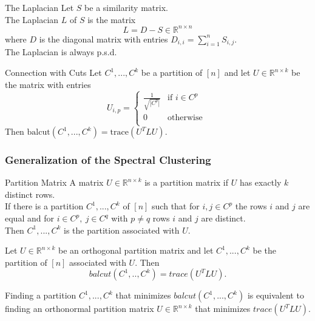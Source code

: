 \documentclass[english]{panikzettel}
\begin{document}
\begin{halfboxl}
\vspace{-\baselineskip}
	\begin{defi}{The Laplacian}
	Let $S$ be a similarity matrix. \\
	The Laplacian $L$ of $S$ is the matrix
	\[
	L=D-S\in \mathbb{R}^{n\times n}
	\]
	where $D$ is the diagonal matrix with entries $D_{i,i}=\sum_{i=1}^n S_{i,j}$.\\
	The Laplacian is always p.s.d.
	\end{defi}
\end{halfboxl}
\begin{halfboxr}
\vspace{-\baselineskip}
	\begin{theo}{Connection with Cuts}
	Let $C^1, ..., C^k$ be a partition of $[n]$ and let $U\in\mathbb{R}^{n\times k}$ be the matrix with entries
	\[
	U_{i,p}=
	\begin{cases}
	\frac{1}{\sqrt{|C^p|}} & \text{if } i\in C^p \\
	0 & \text{otherwise } \\
	\end{cases}
	\]
	Then $\text{balcut}(C^1,...,C^k)=\text{trace}(U^TLU)$.
	\end{theo}
\end{halfboxr}



\subsubsection{Generalization of the Spectral Clustering}
\begin{halfboxl}
\vspace{-\baselineskip}
	\begin{defi}{Partition Matrix}
	A matrix $U\in\mathbb{R}^{n\times k}$ is a partition matrix if $U$ has exactly $k$ distinct rows.\\

	If there is a partition $C^1,...,C^k$ of $[n]$ such that for $i,j\in C^p$ the rows $i$ and $j$ are equal and for $i\in C^p, \ j\in C^q$ with $p\neq q$ rows $i$ and $j$ are distinct.\\
	Then $C^1,...,C^k$ is the partition associated with $U$.
	\end{defi}
\end{halfboxl}
\begin{halfboxr}
\vspace{-\baselineskip}
	\begin{theo}{}
	Let $U\in \mathbb{R}^{n\times k}$ be an orthogonal partition matrix and let $C^1,...,C^k$ be the partition of $[n]$ associated with $U$. Then
	\[
	balcut(C^1,..,C^k)=trace(U^TLU).
	\]
	\end{theo}
	Finding a partition $C^1,...,C^k$ that minimizes $balcut(C^1,...,C^k)$ is equivalent to finding an orthonormal partition matrix $U\in\mathbb{R}^{n\times k}$ that minimizes $trace(U^TLU)$.
\end{halfboxr}
\end{document}
